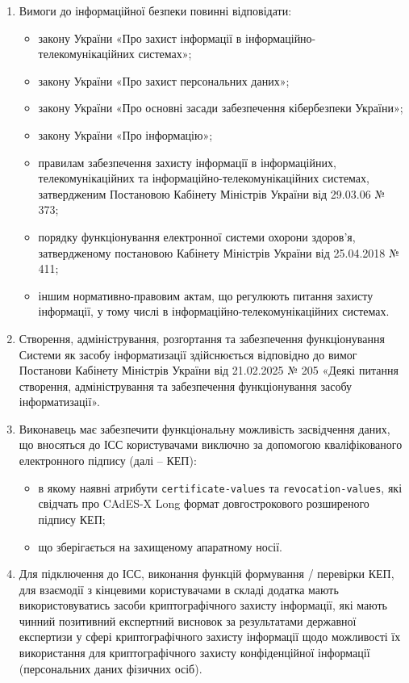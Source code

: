 \documentclass{article}
\begin{document}
\begin{enumerate}
  \item Вимоги до інформаційної безпеки повинні відповідати:
    \begin{itemize}
      \item закону України «Про захист інформації в інформаційно-телекомунікаційних системах»;
      \item закону України «Про захист персональних даних»;
      \item закону України «Про основні засади забезпечення кібербезпеки України»;
      \item закону України «Про інформацію»;
      \item правилам забезпечення захисту інформації в інформаційних, телекомунікаційних та інформаційно-телекомунікаційних системах, затвердженим Постановою Кабінету Міністрів України від 29.03.06 № 373;
      \item порядку функціонування електронної системи охорони здоров’я, затвердженому постановою Кабінету Міністрів України від 25.04.2018 № 411;
      \item іншим нормативно-правовим актам, що регулюють питання захисту інформації, у тому числі в інформаційно-телекомунікаційних системах.
    \end{itemize}

  \item Створення, адміністрування, розгортання та забезпечення функціонування Системи як засобу інформатизації здійснюється відповідно до вимог Постанови Кабінету Міністрів України від 21.02.2025 № 205 «Деякі питання створення, адміністрування та забезпечення функціонування засобу інформатизації».

  \item Виконавець має забезпечити функціональну можливість засвідчення даних, що вносяться до ІСС
        користувачами виключно за допомогою кваліфікованого електронного підпису (далі – КЕП):
    \begin{itemize}
      \item в якому наявні атрибути \texttt{certificate-values} та \texttt{revocation-values},
            які свідчать про CAdES-X Long формат довгострокового розширеного підпису КЕП;
      \item що зберігається на захищеному апаратному носії.
    \end{itemize}

  \item Для підключення до ІСС, виконання функцій формування / перевірки КЕП, для взаємодії з кінцевими
        користувачами в складі додатка мають використовуватись засоби криптографічного захисту інформації,
        які мають чинний позитивний експертний висновок за результатами державної експертизи у сфері
        криптографічного захисту інформації щодо можливості їх використання для криптографічного захисту
        конфіденційної інформації (персональних даних фізичних осіб).


\end{enumerate}
\end{document}
